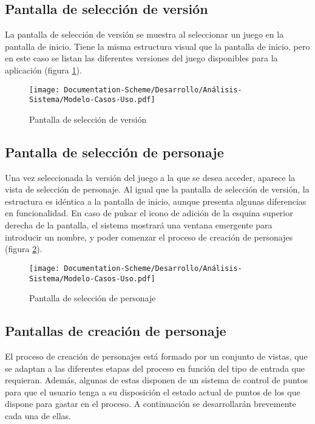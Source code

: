 \subsection{Pantalla de selección de versión}
La pantalla de selección de versión se muestra al seleccionar un juego en la pantalla de inicio.
Tiene la misma estructura visual que la pantalla de inicio, pero en este caso se listan las diferentes versiones 
del juego disponibles para la aplicación (figura \ref*{SeleccionVersion}).

\begin{figure}[H]
    \centering
    \texttt{[image: Documentation-Scheme/Desarrollo/Análisis-Sistema/Modelo-Casos-Uso.pdf]}
    \caption{Pantalla de selección de versión}
    \label{SeleccionVersion}    
\end{figure}

\subsection{Pantalla de selección de personaje}
Una vez seleccionada la versión del juego a la que se desea acceder, aparece la vista de selección de personaje.
Al igual que la pantalla de selección de versión, la estructura es idéntica a la pantalla de inicio, aunque presenta 
algunas diferencias en funcionalidad. En caso de pulsar el icono de adición de la esquina superior derecha de la pantalla, 
el sistema mostrará una ventana emergente para introducir un nombre, y poder comenzar el proceso de creación de personajes 
(figura \ref*{NombrePersonajeNuevo}).

\begin{figure}[H]
    \centering
    \texttt{[image: Documentation-Scheme/Desarrollo/Análisis-Sistema/Modelo-Casos-Uso.pdf]}
    \caption{Pantalla de selección de personaje}
    \label{NombrePersonajeNuevo}    
\end{figure}

\subsection{Pantallas de creación de personaje}
El proceso de creación de personajes está formado por un conjunto de vistas, que se adaptan a las diferentes etapas del 
proceso en función del tipo de entrada que requieran. Además, algunas de estas disponen de un sistema de control de puntos 
para que el usuario tenga a su disposición el estado actual de puntos de los que dispone para gastar en el proceso.
A continuación se desarrollarán brevemente cada una de ellas.

